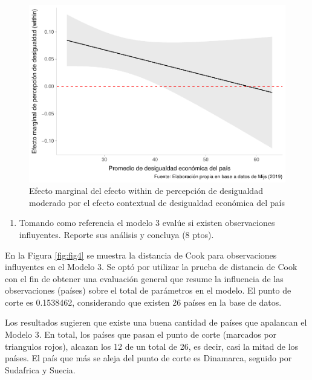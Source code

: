 \documentclass[
  12pt,
  a4paper,
]{article}
\providecommand{\tightlist}{%
  \setlength{\itemsep}{0pt}\setlength{\parskip}{0pt}}
\begin{document}
\begin{figure}

{\centering \includegraphics[width=0.8\linewidth]{03-guia_files/figure-latex/fig3-1} 

}

\caption{Efecto marginal del efecto within de percepción de desigualdad moderado por el efecto contextual de desigualdad económica del país}\label{fig:fig3}
\end{figure}

\begin{enumerate}
\def\labelenumi{\alph{enumi})}
\setcounter{enumi}{3}
\tightlist
\item
  Tomando como referencia el modelo 3 evalúe si existen observaciones influyentes. Reporte sus análisis y concluya (8 ptos).
\end{enumerate}

En la Figura \ref{fig:fig4} se muestra la distancia de Cook para observaciones influyentes en el Modelo 3. Se optó por utilizar la prueba de distancia de Cook con el fin de obtener una evaluación general que resume la influencia de las observaciones (países) sobre el total de parámetros en el modelo. El punto de corte es 0.1538462, considerando que existen 26 países en la base de datos.

Los resultados sugieren que existe una buena cantidad de países que apalancan el Modelo 3. En total, los países que pasan el punto de corte (marcados por triangulos rojos), alcazan los 12 de un total de 26, es decir, casi la mitad de los países. El país que más se aleja del punto de corte es Dinamarca, seguido por Sudafrica y Suecia.
\end{document}
